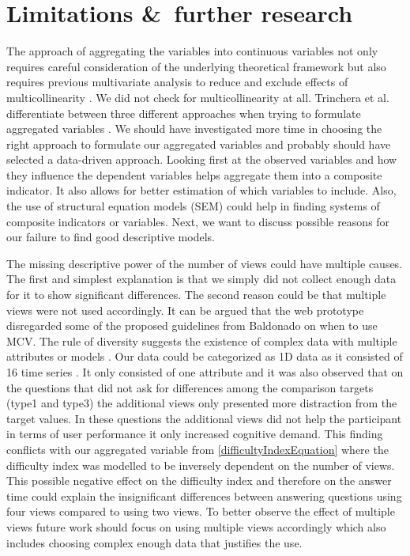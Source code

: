 \section{Limitations \&\ further research}
The approach of aggregating the variables into continuous variables not only requires careful consideration of the underlying theoretical framework
but also requires previous multivariate analysis to reduce and exclude effects of multicollinearity \citep*{MichelaNardo.2005}. We did not check for multicollinearity
at all.
Trinchera et al. differentiate between three different approaches when trying to formulate aggregated variables \citep*{Trinchera.2008}. We should have
investigated more time in choosing the right approach to formulate our aggregated variables and probably should have selected a data-driven approach. Looking first at 
the observed variables and how they influence the dependent variables helps aggregate them into a composite indicator. It also allows for better estimation of which
variables to include. Also, the use of structural equation models (SEM) could help in finding systems of composite indicators or variables. Next, we want to discuss possible 
reasons for our failure to find good descriptive models.

The missing descriptive power of the number of views could have multiple causes. The first and simplest explanation is that we simply did not collect enough data for it
to show significant differences. The second reason could be that multiple views were not used accordingly. 
It can be argued that the web prototype disregarded some of the proposed guidelines from Baldonado on when to use MCV. The rule of diversity
suggests the existence of complex data with multiple attributes or models \citep*{WangBaldonado.2000}. Our data could be categorized as 1D data as it consisted of 16
time series \citep*{Keim.2005}. It only consisted of one attribute and it was also observed that on the questions that did not ask for differences among
the comparison targets (type1 and type3) the additional views only presented more distraction from the target values. In these questions the additional views did not
help the participant in terms of user performance it only increased cognitive demand. This finding conflicts with our aggregated variable from \ref{difficultyIndexEquation}
where the difficulty index was modelled to be inversely dependent on the number of views. This possible negative effect on the difficulty index and therefore on the
answer time could explain the insignificant differences between answering questions using four views compared to using two views. To better observe the effect of
multiple views future work should focus on using multiple views accordingly which also includes choosing complex enough data that justifies the use.

